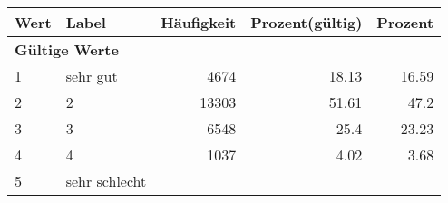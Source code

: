     \begin{longtable}{lXrrr}
     \toprule
     \textbf{Wert} & \textbf{Label} & \textbf{Häufigkeit} & \textbf{Prozent(gültig)} & \textbf{Prozent} \\
     \endhead
     \midrule
     \multicolumn{5}{l}{\textbf{Gültige Werte}}\\

     1 &
     \multicolumn{1}{X}{ sehr gut   } &


       \num{4674} &
       \num[round-mode=places,round-precision=2]{18,13} &
         \num[round-mode=places,round-precision=2]{16,59} \\

     2 &
     \multicolumn{1}{X}{ 2   } &


       \num{13303} &
       \num[round-mode=places,round-precision=2]{51,61} &
         \num[round-mode=places,round-precision=2]{47,2} \\

     3 &
     \multicolumn{1}{X}{ 3   } &


       \num{6548} &
       \num[round-mode=places,round-precision=2]{25,4} &
         \num[round-mode=places,round-precision=2]{23,23} \\

     4 &
     \multicolumn{1}{X}{ 4   } &


       \num{1037} &
       \num[round-mode=places,round-precision=2]{4,02} &
         \num[round-mode=places,round-precision=2]{3,68} \\

     5 &
     \multicolumn{1}{X}{ sehr schlecht   } &



\end{longtable}
